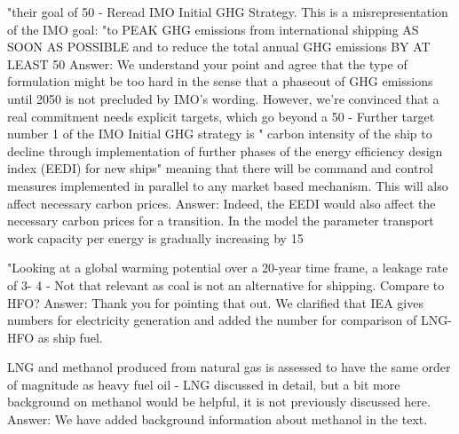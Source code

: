 "their goal of 50%
-	Reread IMO Initial GHG Strategy. This is a misrepresentation of the IMO goal: "to PEAK GHG emissions from international shipping AS SOON AS POSSIBLE and to reduce the total annual GHG emissions BY AT LEAST 50%
Answer: We understand your point and agree that the type of formulation might be too hard in the sense that a phaseout of GHG emissions until 2050 is not precluded by IMO's wording. However, we're convinced that a real commitment needs explicit targets, which go beyond a 50%
-	Further target number 1 of the IMO Initial GHG strategy is " carbon intensity of the ship to decline through implementation of further phases of the energy efficiency design index (EEDI) for new ships" meaning that there will be command and control measures implemented in parallel to any market based mechanism. This will also affect necessary carbon prices.
Answer: Indeed, the EEDI would also affect the necessary carbon prices for a transition. In the model the parameter transport work capacity per energy is gradually increasing by 15%

"Looking at a global warming potential over a 20-year time frame, a leakage rate of 3- 4 %
-	Not that relevant as coal is not an alternative for shipping. Compare to HFO?
Answer: Thank you for pointing that out. We clarified that IEA gives numbers for electricity generation and added the number for comparison of LNG-HFO as ship fuel.

LNG and methanol produced from natural gas is assessed to have the same order of magnitude as heavy fuel oil
-	LNG discussed in detail, but a bit more background on methanol would be helpful, it is not previously discussed here.
Answer: We have added background information about methanol in the text.

